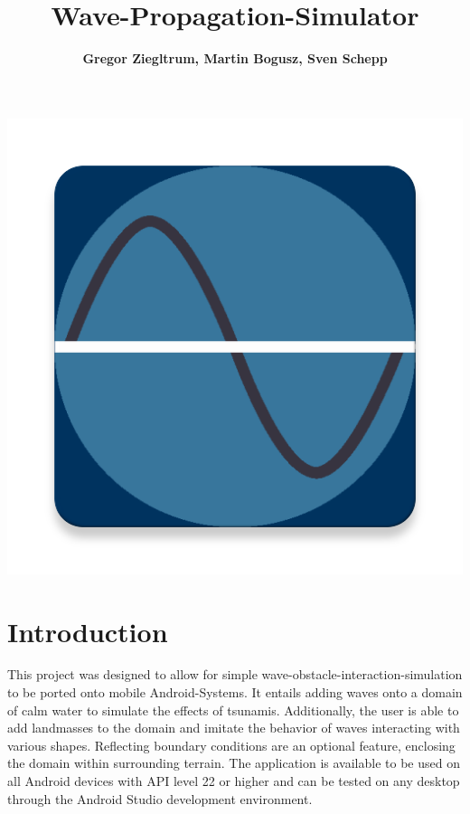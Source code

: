 \documentclass[11pt,a4paper]{article}
\begin{document}
\marginsize{2.5cm}{3cm}{2.5cm}{2cm}
\makeatletter
\def\ps@myPS{%
    \def\@oddfoot{\null\hfill\thepage}
    \def\@evenfoot{\thepage}%
    \def\@evenhead{\null\hfil\slshape\leftmark}%
    \def\@oddhead{{\slshape\rightmark}}}%
\makeatother
\pagestyle{myPS}

\author{\textbf{Gregor Ziegltrum, Martin Bogusz, Sven Schepp}}
\title{\textbf{Wave-Propagation-Simulator}}
\maketitle
\linespread{1.8}

\begin{center}
\includegraphics[scale=0.30]{ic_launcher-web.png}
\end{center}



\pagebreak
\thispagestyle{empty}
\tableofcontents
\pagebreak


\section{Introduction}

This project was designed to allow for simple wave-obstacle-interaction-simulation to be ported onto mobile Android-Systems. It entails adding waves onto a domain of calm water to simulate the effects of tsunamis. Additionally, the user is able to add landmasses to the domain and imitate the behavior of waves interacting with various shapes. Reflecting boundary conditions are an optional feature, enclosing the domain within surrounding terrain. The application is available to be used on all Android devices with API level 22 or higher and can be tested on any desktop through the Android Studio development environment.
\end{document}
